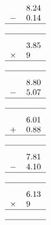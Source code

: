 \documentclass[leqno, 12pt]{article}
\begin{document}
\begin{multicols}{3}
\vspace{-1pt}%
\begin{equation}
    \raisebox{-0.8cm}{
        \begin{tabular}{c S[table-format=1.2]}
         &8.24 \tabularnewline
        $-$&0.14 \tabularnewline
        \hline
         & \tabularnewline
        \hline
    \end{tabular}}
\end{equation}
\vspace{-1pt}%
\begin{equation}
    \raisebox{-0.8cm}{
        \begin{tabular}{c S[table-format=1.2]}
         &3.85 \tabularnewline
        $\times$&9 \tabularnewline
        \hline
         & \tabularnewline
        \hline
    \end{tabular}}
\end{equation}
\vspace{-1pt}%
\begin{equation}
    \raisebox{-0.8cm}{
        \begin{tabular}{c S[table-format=1.2]}
         &8.80 \tabularnewline
        $-$&5.07 \tabularnewline
        \hline
         & \tabularnewline
        \hline
    \end{tabular}}
\end{equation}
\vspace{-1pt}%
\begin{equation}
    \raisebox{-0.8cm}{
        \begin{tabular}{c S[table-format=1.2]}
         &6.01 \tabularnewline
        $+$&0.88 \tabularnewline
        \hline
         & \tabularnewline
        \hline
    \end{tabular}}
\end{equation}
\vspace{-1pt}%
\begin{equation}
    \raisebox{-0.8cm}{
        \begin{tabular}{c S[table-format=1.2]}
         &7.81 \tabularnewline
        $-$&4.10 \tabularnewline
        \hline
         & \tabularnewline
        \hline
    \end{tabular}}
\end{equation}
\vspace{-1pt}%
\begin{equation}
    \raisebox{-0.8cm}{
        \begin{tabular}{c S[table-format=1.2]}
         &6.13 \tabularnewline
        $\times$&9 \tabularnewline
        \hline
         & \tabularnewline
        \hline
    \end{tabular}}
\end{equation}
\vspace{-1pt}
\end{multicols}
\end{document}
